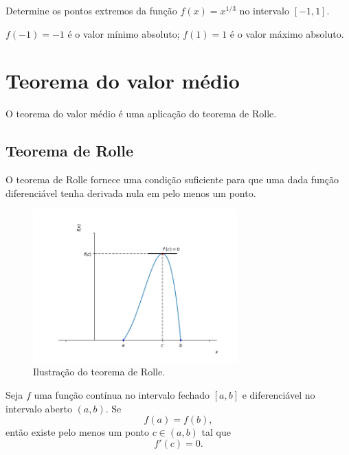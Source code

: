 \begin{ex}
  Determine os pontos extremos da função $f(x)=x^{1/3}$ no intervalo $[-1,1]$.
\end{ex}
\begin{resp}
  $f(-1)=-1$ é o valor mínimo absoluto; $f(1)=1$ é o valor máximo absoluto.
\end{resp}

\emconstrucao

\section{Teorema do valor médio}\label{cap_apderiv_sec_valormedio}

O teorema do valor médio é uma aplicação do teorema de Rolle.

\subsection{Teorema de Rolle}

O teorema de Rolle fornece uma condição suficiente para que uma dada função diferenciável tenha derivada nula em pelo menos um ponto.

\begin{figure}[H]
  \centering
  \includegraphics[width=0.7\textwidth]{./cap_apderiv/dados/fig_teo_Rolle/fig_teo_Rolle}
  \caption{Ilustração do teorema de Rolle.}
  \label{fig:teo_Rolle}
\end{figure}

\begin{teo}
  Seja $f$ uma função contínua no intervalo fechado $[a, b]$ e diferenciável no intervalo aberto $(a, b)$. Se
  \begin{equation}
    f(a)=f(b),
  \end{equation}
  então existe pelo menos um ponto $c\in (a, b)$ tal que
  \begin{equation}
    f'(c)=0.
  \end{equation}
\end{teo}

